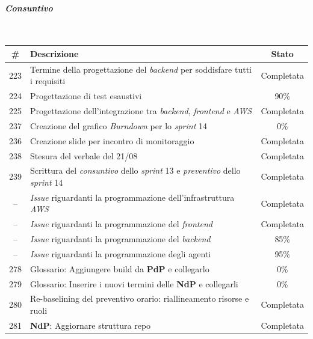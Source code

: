 \documentclass[12pt, a4paper]{article}
\begin{document}
{\paragraph{\textit{Consuntivo}}~

\begin{table}[H]
    \centering
    \renewcommand{\arraystretch}{1.3}
    \begin{tabularx}{\textwidth}{|c|X|c|}
        \hline
        \textbf{\#} & \textbf{Descrizione} & \textbf{Stato} \\ \hline
        223 & Termine della progettazione del \textit{backend} per soddisfare tutti i requisiti & Completata \\ \hline
        224 & Progettazione di test esaustivi & 90\% \\ \hline
        225 & Progettazione dell'integrazione tra \textit{backend}, \textit{frontend} e \textit{AWS} & Completata \\ \hline
        237 & Creazione del grafico \textit{Burndown} per lo \textit{sprint} 14 & 0\% \\ \hline
        236 & Creazione slide per incontro di monitoraggio & Completata \\ \hline
        238 & Stesura del verbale del 21/08 & Completata \\ \hline
        239 & Scrittura del \textit{consuntivo} dello \textit{sprint} 13 e \textit{preventivo} dello \textit{sprint} 14 & Completata \\ \hline
        -- & \textit{Issue} riguardanti la programmazione dell'infrastruttura \textit{AWS} & Completata \\ \hline
        -- & \textit{Issue} riguardanti la programmazione del \textit{frontend} & Completata \\ \hline
        -- & \textit{Issue} riguardanti la programmazione del \textit{backend} & 85\% \\ \hline
        -- & \textit{Issue} riguardanti la programmazione degli agenti & 95\% \\ \hline
        278 & Glossario: Aggiungere build da \textbf{PdP} e collegarlo & 0\% \\ \hline
        279 & Glossario: Inserire i nuovi termini delle \textbf{NdP} e collegarli & 0\% \\ \hline
        280 & Re-baselining del preventivo orario: riallineamento risorse e ruoli & Completata \\ \hline
        281 & \textbf{NdP}: Aggiornare struttura repo & Completata \\ \hline

\end{tabularx}
\end{table}}
\end{document}
